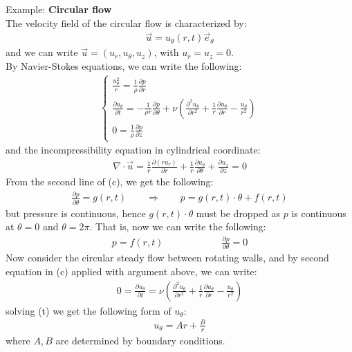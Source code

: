 \documentclass[11pt]{book}
\theoremstyle{break}
\theoremstyle{break}
\newcommand{\example}{\color{green}Example: \color{black}}
\begin{document}
\newpage
\example \textbf{Circular flow}\\
The velocity field of the circular flow is characterized by:
\begin{align*}
\vec{u} = u_{\theta} (r,t) \vec{e}_{\theta}
\end{align*}
and we can write $\vec{u} = (u_{r}, u_{\theta}, u_z)$, with $u_r = u_z = 0$. \\
By Navier-Stokes equations, we can write the following:
\begin{align}
\begin{cases}
\frac{u_{\theta}^2}{r} = \frac{1}{\rho} \frac{\partial p}{\partial r}\\
\frac{\partial u_{\theta}}{\partial t} = -\frac{1}{\rho r}\frac{\partial p}{\partial \theta} + \nu\left(\frac{\partial^2 u_{\theta}}{\partial r^2} + \frac{1}{r}\frac{\partial u_{\theta}}{\partial r} - \frac{u_{\theta}}{r^2}\right)\\
0 = \frac{1}{\rho} \frac{\partial p}{\partial z}
\end{cases} \tag{c}
\end{align}
and the incompressibility equation in cylindrical coordinate:
\begin{align*}
\nabla \cdot \vec{u} = \frac{1}{r} \frac{\partial (ru_r)}{\partial r} + \frac{1}{r}\frac{\partial u_{\theta}}{\partial \theta}+ \frac{\partial u_z}{\partial z} = 0
\end{align*}
From the second line of (c), we get the following:
\begin{align*}
\frac{\partial p}{\partial \theta} = g(r,t) \qquad \Rightarrow \qquad p = g(r,t) \cdot \theta + f(r,t)
\end{align*}
but pressure is continuous, hence $g(r,t) \cdot \theta$ must be dropped as $p$ is continuous at $\theta = 0$ and $\theta = 2\pi$. That is, now we can write the following:
\begin{align*}
p = f(r,t) \qquad\qquad\qquad \frac{\partial p}{\partial \theta} = 0
\end{align*}
Now consider the circular steady flow between rotating walls, and by second equation in (c) applied with argument above, we can write:
\begin{align*}
0 = \frac{\partial u_{\theta}}{\partial t} = \nu\left(\frac{\partial^2 u_{\theta}}{\partial r^2} + \frac{1}{r}\frac{\partial u_{\theta}}{\partial r} - \frac{u_{\theta}}{r^2}\right) \tag{t}
\end{align*}
solving (t) we get the following form of $u_{\theta}$:
\begin{align*}
u_{\theta} = Ar + \frac{B}{r}
\end{align*}
where $A,B$ are determined by boundary conditions.\\
\end{document}
